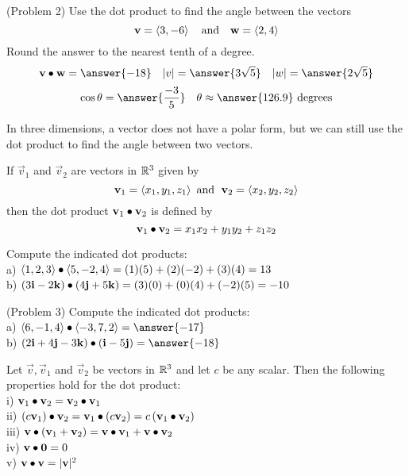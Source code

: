 \documentclass[handout]{ximera}
\begin{document}
\begin{problem}(Problem 2) Use the dot product to find the angle between the vectors 
\[
\mathbf v = \left\langle 3,-6\right\rangle \quad \text{and} \quad \mathbf w = \left\langle 2,4\right\rangle
\]
Round the answer to the nearest tenth of a degree.\\
\[
\vec v \dotp \vec w = \answer{-18} \quad |v| = \answer{3\sqrt{5}} \quad |w| = \answer{2\sqrt{5}}
\]
\[
\cos \theta = \answer{\frac{-3}{5}} \quad \theta \approx \answer{126.9} \text{ degrees}
\]
\end{problem}


In three dimensions, a vector does not have a polar form, but we can still use the dot product to find the angle between two vectors.
\begin{definition}
If $\vec{v}_1$ and $\vec{v}_2$ are vectors in $\mathbb R^3$ given by
\[
\mathbf{v}_1 = \left\langle x_1, y_1, z_1\right\rangle \text{  and   } \;\mathbf{v}_2 = \left\langle x_2, y_2, z_2\right\rangle
\]
then the dot product $\mathbf{v}_1 \bullet \mathbf{v}_2$ is defined by
\[
\mathbf{v}_1 \bullet \mathbf{v}_2 = x_1x_2 + y_1y_2 + z_1z_2
\]
\end{definition}

\begin{example}[Example 3]
Compute the indicated dot products:\\
a) $\left\langle 1, 2, 3\right\rangle \bullet \left\langle 5, -2, 4\right\rangle = (1)(5)+ (2)(-2) + (3)(4) = 13$\\
b) $\left(3\mathbf{i} - 2\mathbf{k}\right) \bullet \left(4\mathbf{j} + 5\mathbf{k}\right) = (3)(0) + (0)(4) + (-2)(5) = -10$
\end{example}

\begin{problem}(Problem 3)
Compute the indicated dot products:\\
a) $\vector{6, -1, 4} \dotp \vector{-3, 7, 2} = \answer{-17}$\\
b) $\left(2\vec{i} + 4\vec{j} - 3\vec{k}\right) \dotp \left(\vec{i} -5\vec{j}\right) = \answer{-18}$
\end{problem}


\begin{proposition}
Let $\vec{v} , \vec{v}_1 $ and $ \vec{v}_2$ be vectors in $\mathbb R^3$ and let $c$ be any scalar. 
Then the following properties hold for the dot product:\\
i) $\mathbf{v}_1 \bullet \mathbf{v}_2 =\mathbf{v}_2 \bullet \mathbf{v}_1$\\
ii) $\left(c\mathbf{v}_1\right) \bullet \mathbf{v}_2 =\mathbf{v}_1 \bullet \left(c\mathbf{v}_2\right) = c\left(\mathbf{v}_1 \bullet \mathbf{v}_2\right)$\\
iii)  $\mathbf{v} \bullet \left(\mathbf{v}_1 +\mathbf{v}_2\right) =\mathbf{v} \bullet\mathbf{v}_1 +\mathbf{v}\bullet \mathbf{v}_2$\\
iv) $\mathbf{v} \bullet \mathbf{0} = 0$\\
v) $\mathbf{v} \bullet \mathbf{v} = |\mathbf{v}|^2$
\end{proposition}
\end{document}
